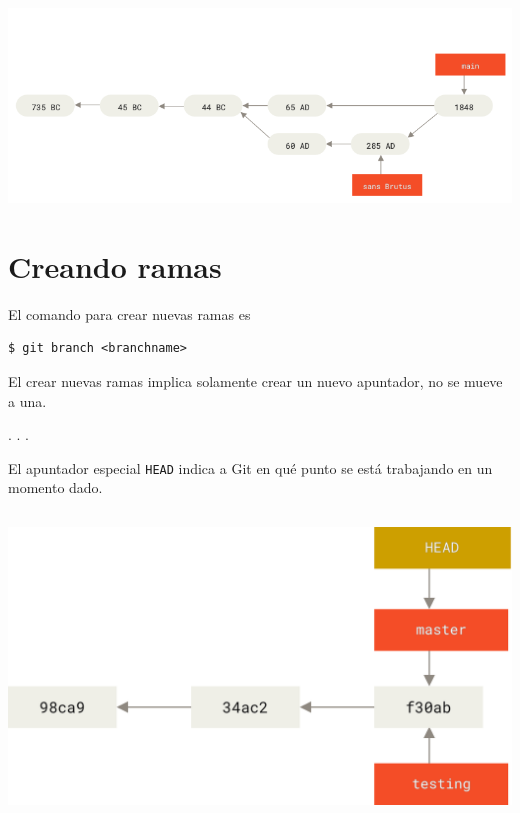 \subsection{}

\includegraphics{figs/timeline5.png}

\section{Creando ramas}

El comando para crear nuevas ramas es

\begin{lstlisting}
$ git branch <branchname>
\end{lstlisting}

El crear nuevas ramas implica solamente crear un nuevo apuntador, no se
mueve a una.

. . .

El apuntador especial \passthrough{\lstinline!HEAD!} indica a Git en qué
punto se está trabajando en un momento dado.

\subsection{}

\includegraphics{figs/head-to-master.png}

